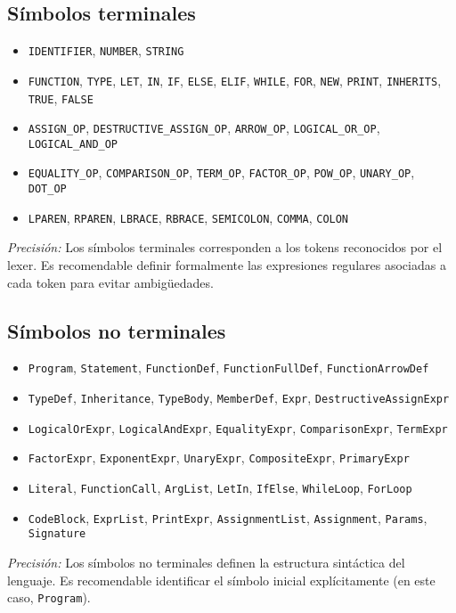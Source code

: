 \documentclass[a4paper,12pt]{article}
\begin{document}
\subsection*{Símbolos terminales}
\begin{itemize}
    \item \texttt{IDENTIFIER}, \texttt{NUMBER}, \texttt{STRING}
    \item \texttt{FUNCTION}, \texttt{TYPE}, \texttt{LET}, \texttt{IN}, \texttt{IF}, \texttt{ELSE}, \texttt{ELIF}, \texttt{WHILE}, \texttt{FOR}, \texttt{NEW}, \texttt{PRINT}, \texttt{INHERITS}, \texttt{TRUE}, \texttt{FALSE}
    \item \texttt{ASSIGN\_OP}, \texttt{DESTRUCTIVE\_ASSIGN\_OP}, \texttt{ARROW\_OP}, \texttt{LOGICAL\_OR\_OP}, \texttt{LOGICAL\_AND\_OP}
    \item \texttt{EQUALITY\_OP}, \texttt{COMPARISON\_OP}, \texttt{TERM\_OP}, \texttt{FACTOR\_OP}, \texttt{POW\_OP}, \texttt{UNARY\_OP}, \texttt{DOT\_OP}
    \item \texttt{LPAREN}, \texttt{RPAREN}, \texttt{LBRACE}, \texttt{RBRACE}, \texttt{SEMICOLON}, \texttt{COMMA}, \texttt{COLON}
\end{itemize}
\vspace{-0.5em}
\textit{Precisión:} Los símbolos terminales corresponden a los tokens reconocidos por el lexer. Es recomendable definir formalmente las expresiones regulares asociadas a cada token para evitar ambigüedades.

\subsection*{Símbolos no terminales}
\begin{itemize}
    \item \texttt{Program}, \texttt{Statement}, \texttt{FunctionDef}, \texttt{FunctionFullDef}, \texttt{FunctionArrowDef}
    \item \texttt{TypeDef}, \texttt{Inheritance}, \texttt{TypeBody}, \texttt{MemberDef}, \texttt{Expr}, \texttt{DestructiveAssignExpr}
    \item \texttt{LogicalOrExpr}, \texttt{LogicalAndExpr}, \texttt{EqualityExpr}, \texttt{ComparisonExpr}, \texttt{TermExpr}
    \item \texttt{FactorExpr}, \texttt{ExponentExpr}, \texttt{UnaryExpr}, \texttt{CompositeExpr}, \texttt{PrimaryExpr}
    \item \texttt{Literal}, \texttt{FunctionCall}, \texttt{ArgList}, \texttt{LetIn}, \texttt{IfElse}, \texttt{WhileLoop}, \texttt{ForLoop}
    \item \texttt{CodeBlock}, \texttt{ExprList}, \texttt{PrintExpr}, \texttt{AssignmentList}, \texttt{Assignment}, \texttt{Params}, \texttt{Signature}
\end{itemize}
\vspace{-0.5em}
\textit{Precisión:} Los símbolos no terminales definen la estructura sintáctica del lenguaje. Es recomendable identificar el símbolo inicial explícitamente (en este caso, \texttt{Program}).
\end{document}
